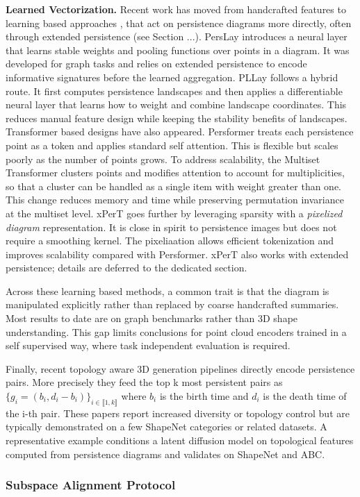 \textbf{Learned Vectorization.} Recent work has moved from handcrafted features to learning based approaches \cite{adaptive_topological_feature},\cite{topological_signature} that act on persistence diagrams more directly, often through extended persistence \cite{extended_persistence} (see Section ...). PersLay \cite{perslay} introduces a neural layer that learns stable weights and pooling functions over points in a diagram. It was developed for graph tasks and relies on extended persistence to encode informative signatures before the learned aggregation. PLLay \cite{pllay} follows a hybrid route. It first computes persistence landscapes and then applies a differentiable neural layer that learns how to weight and combine landscape coordinates. This reduces manual feature design while keeping the stability benefits of landscapes. Transformer based designs have also appeared. Persformer \cite{persformer} treats each persistence point as a token and applies standard self attention. This is flexible but scales poorly as the number of points grows. To address scalability, the Multiset Transformer \cite{multiset_transformer} clusters points and modifies attention to account for multiplicities, so that a cluster can be handled as a single item with weight greater than one. This change reduces memory and time while preserving permutation invariance at the multiset level. xPerT \cite{xpert} goes further by leveraging sparsity with a \textit{pixelized diagram} representation. It is close in spirit to persistence images but does not require a smoothing kernel. The pixeliaation allows efficient tokenization and improves scalability compared with Persformer. xPerT also works with extended persistence; details are deferred to the dedicated section.

Across these learning based methods, a common trait is that the diagram is manipulated explicitly rather than replaced by coarse handcrafted summaries. Most results to date are on graph benchmarks rather than 3D shape understanding. This gap limits conclusions for point cloud encoders trained in a self supervised way, where task independent evaluation is required.

Finally, recent topology aware 3D generation pipelines \cite{topology_aware_latent_diffusion} directly encode persistence pairs. More precisely they feed the top k most persistent pairs as $\{g_i=(b_i, d_i-b_i)\}_{i \in \llbracket 1,k\rrbracket}$ where $b_i$ is the birth time and $d_i$ is the death time of the i-th pair. These papers report increased diversity or topology control but are typically demonstrated on a few ShapeNet categories or related datasets. A representative example conditions a latent diffusion model on topological features computed from persistence diagrams and validates on ShapeNet and ABC.

\subsubsection{Subspace Alignment Protocol}
\label{sssec:subspace_alignment_protocol}

